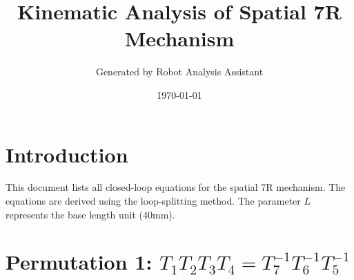 \documentclass{article}
\title{Kinematic Analysis of Spatial 7R Mechanism}
\author{Generated by Robot Analysis Assistant}
\date{\today}
\begin{document}
\maketitle
\tableofcontents
\newpage

\section{Introduction}
This document lists all closed-loop equations for the spatial 7R mechanism. 
The equations are derived using the loop-splitting method.
The parameter $L$ represents the base length unit (40mm).

\section{Permutation 1: $T_{1}T_{2}T_{3}T_{4} = T_{7}^{-1}T_{6}^{-1}T_{5}^{-1}$}
\end{document}
